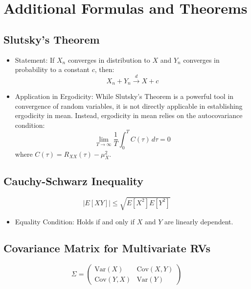 \documentclass[12pt]{article}
\begin{document}
\section{Additional Formulas and Theorems}

\subsection{Slutsky's Theorem}
\begin{itemize}
    \item Statement: If \( X_n \) converges in distribution to \( X \) and \( Y_n \) converges in probability to a constant \( c \), then:
    \[
    X_n + Y_n \xrightarrow{d} X + c
    \]
    \item Application in Ergodicity: While Slutsky's Theorem is a powerful tool in convergence of random variables, it is not directly applicable in establishing ergodicity in mean. Instead, ergodicity in mean relies on the autocovariance condition:
    \[
    \lim_{T \to \infty} \frac{1}{T} \int_{0}^{T} C(\tau) \, d\tau = 0
    \]
    where \( C(\tau) = R_{XX}(\tau) - \mu_X^2 \).
\end{itemize}

\subsection{Cauchy-Schwarz Inequality}
\[
|E[XY]| \leq \sqrt{E[X^2] E[Y^2]}
\]
\begin{itemize}
    \item Equality Condition: Holds if and only if \( X \) and \( Y \) are linearly dependent.
\end{itemize}

\subsection{Covariance Matrix for Multivariate RVs}
\[
\Sigma = 
\begin{pmatrix}
\text{Var}(X) & \text{Cov}(X,Y) \\
\text{Cov}(Y,X) & \text{Var}(Y)
\end{pmatrix}
\]
\end{document}
